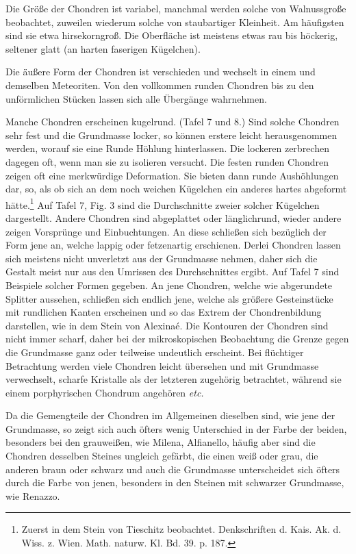\documentclass[a4paper, 12pt, oneside]{article}
\begin{document}
Die Größe der Chondren ist variabel, manchmal werden solche von Walnussgroße beobachtet, zuweilen wiederum solche von staubartiger Kleinheit. Am häufigsten sind sie etwa hirsekorngroß. Die Oberfläche ist meistens etwas rau bis höckerig, seltener glatt (an harten faserigen Kügelchen).

Die äußere Form der Chondren ist verschieden und wechselt in einem und demselben Meteoriten. Von den vollkommen runden Chondren bis zu den unförmlichen Stücken lassen sich alle Übergänge wahrnehmen.

Manche Chondren erscheinen kugelrund. (Tafel 7 und 8.) Sind solche Chondren sehr fest und die Grundmasse locker, so können erstere leicht herausgenommen werden, worauf sie eine Runde Höhlung hinterlassen. Die lockeren zerbrechen dagegen oft, wenn man sie zu isolieren versucht. Die festen runden Chondren zeigen oft eine merkwürdige Deformation. Sie bieten dann runde Aushöhlungen dar, so, als ob sich an dem noch weichen Kügelchen ein anderes hartes abgeformt hätte.\footnote{Zuerst in dem Stein von Tieschitz beobachtet. Denkschriften d. Kais. Ak. d. Wiss. z. Wien. Math. naturw. Kl. Bd. 39. p. 187.} Auf Tafel 7, Fig. 3 sind die Durchschnitte zweier solcher Kügelchen dargestellt. Andere Chondren sind abgeplattet oder länglichrund, wieder andere zeigen Vorsprünge und Einbuchtungen. An diese schließen sich bezüglich der Form jene an, welche lappig oder fetzenartig erschienen. Derlei Chondren lassen sich meistens nicht unverletzt aus der Grundmasse nehmen, daher sich die Gestalt meist nur aus den Umrissen des Durchschnittes ergibt. Auf Tafel 7 sind Beispiele solcher Formen gegeben. An jene Chondren, welche wie abgerundete Splitter aussehen, schließen sich endlich jene, welche als größere Gesteinstücke mit rundlichen Kanten erscheinen und so das Extrem der Chondrenbildung darstellen, wie in dem Stein von Alexinaé. Die Kontouren der Chondren sind nicht immer scharf, daher bei der mikroskopischen Beobachtung die Grenze gegen die Grundmasse ganz oder teilweise undeutlich erscheint. Bei flüchtiger Betrachtung werden viele Chondren leicht übersehen und mit Grundmasse verwechselt, scharfe Kristalle als der letzteren zugehörig betrachtet, während sie einem porphyrischen Chondrum angehören \emph{etc.}

Da die Gemengteile der Chondren im Allgemeinen dieselben sind, wie jene der Grundmasse, so zeigt sich auch öfters wenig Unterschied in der Farbe der beiden, besonders bei den grauweißen, wie Milena, Alfianello, häufig aber sind die Chondren desselben Steines ungleich gefärbt, die einen weiß oder grau, die anderen braun oder schwarz und auch die Grundmasse unterscheidet sich öfters durch die Farbe von jenen, besonders in den Steinen mit schwarzer Grundmasse, wie Renazzo.
\end{document}
